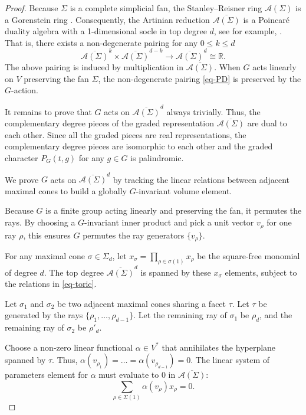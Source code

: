 \documentclass{amsart}
\theoremstyle{definition}
\theoremstyle{remark}
\numberwithin{equation}{section}
\begin{document}
\begin{proof}
    Because $\Sigma$ is a complete simplicial fan, the Stanley--Reisner ring $\mathcal{A}(\Sigma)$ is a Gorenstein ring \cite[Exercise 13.12]{miller2005combinatorial}. Consequently, the Artinian reduction $\overline{\mathcal{A}(\Sigma)}$ is a Poincaré duality algebra with a 1-dimensional socle in top degree $d$, see for example, \cite{brion1997structure}. That is, there exists a non-degenerate pairing for any $0\leq k \leq d$
\begin{equation} \label{eq-PP}
\overline{\mathcal{A}(\Sigma)}^k \times \overline{\mathcal{A}(\Sigma)}^{d-k} \to \overline{\mathcal{A}(\Sigma)}^d \cong \mathbb{R}.
\end{equation}
The above pairing is induced by multiplication in $\overline{\mathcal{A}(\Sigma)}$. When $G$ acts linearly on $V$ preserving the fan $\Sigma$, the non-degenerate pairing \eqref{eq-PD} is preserved by the $G$-action. 

It remains to prove that $G$ acts on $\overline{\mathcal{A}(\Sigma)}^d$ always trivially. Thus, the complementary degree pieces of the graded representation $\overline{\mathcal{A}(\Sigma)}$ are dual to each other. Since all the graded pieces are real representations, the complementary degree pieces are isomorphic to each other and the graded character $
P_G(t, g)$ for any $g \in G$ is palindromic.  

We prove $G$ acts on $\overline{\mathcal{A}(\Sigma)}^d$ by tracking the linear relations between adjacent maximal cones to build a globally $G$-invariant volume element. 

Because $G$ is a finite group acting linearly and preserving the fan, it permutes the rays. By choosing a $G$-invariant inner product and pick a unit vector $v_\rho$ for one ray $\rho$, this ensures $G$ permutes the ray generators $\{v_\rho\}$.

For any maximal cone $\sigma \in \Sigma_d$, let $x_\sigma = \prod_{\rho \in \sigma(1)} x_\rho$ be the square-free monomial of degree $d$. The top degree $\overline{\mathcal{A}(\Sigma)}^d$ is spanned by these $x_\sigma$ elements, subject to the relations in \eqref{eq-toric}.

Let $\sigma_1$ and $\sigma_2$ be two adjacent maximal cones sharing a facet $\tau$.
Let $\tau$ be generated by the rays $\{\rho_1, \dots, \rho_{d-1}\}$.
Let the remaining ray of $\sigma_1$ be $\rho_d$, and the remaining ray of $\sigma_2$ be $\rho'_{d}$.

Choose a non-zero linear functional $\alpha \in V^*$ that annihilates the hyperplane spanned by $\tau$. Thus, $\alpha(v_{\rho_1}) = \dots = \alpha(v_{\rho_{d-1}}) = 0$.
The linear system of parameters element for $\alpha$ must evaluate to $0$ in $\overline{\mathcal{A}(\Sigma)}$:
$$ \sum_{\rho \in \Sigma(1)} \alpha(v_\rho) x_\rho = 0.$$


\end{proof}
\end{document}
